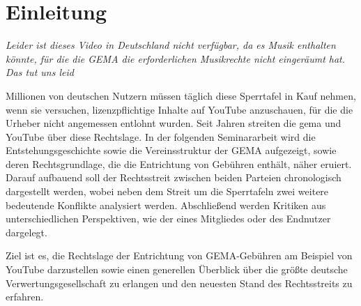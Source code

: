 \chapter{Einleitung}
\textit{\glqq Leider ist dieses Video in Deutschland nicht verfügbar, da es Musik enthalten könnte, für die die GEMA die erforderlichen Musikrechte nicht eingeräumt hat. Das tut uns leid\grqq}

Millionen von deutschen Nutzern müssen täglich diese Sperrtafel in Kauf nehmen, wenn sie versuchen, lizenzpflichtige Inhalte auf YouTube anzuschauen, für die die Urheber nicht angemessen entlohnt wurden. Seit Jahren streiten die \gls{gema} und YouTube über diese Rechtslage. In der folgenden Seminararbeit wird die Entstehungsgeschichte sowie die Vereinsstruktur der GEMA aufgezeigt, sowie deren Rechtsgrundlage, die die Entrichtung von Gebühren enthält, näher eruiert. Darauf aufbauend soll der Rechtsstreit zwischen beiden Parteien chronologisch dargestellt werden, wobei neben dem Streit um die Sperrtafeln zwei weitere bedeutende Konflikte analysiert werden. Abschließend werden Kritiken aus unterschiedlichen Perspektiven, wie der eines Mitgliedes oder des Endnutzer dargelegt.

Ziel ist es, die Rechtslage der Entrichtung von GEMA-Gebühren am Beispiel von YouTube darzustellen sowie einen generellen Überblick über die größte deutsche Verwertungsgesellschaft zu erlangen und den neuesten Stand des Rechtsstreits zu erfahren.